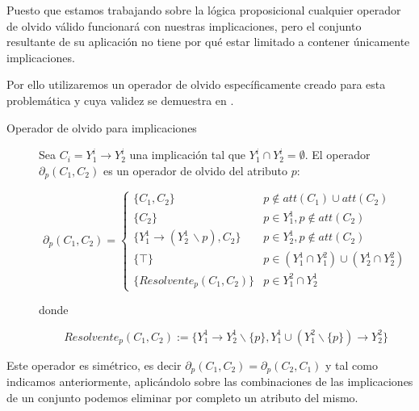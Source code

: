 	Puesto que estamos trabajando sobre la lógica proposicional cualquier operador de olvido válido funcionará con nuestras implicaciones, pero el conjunto resultante de su aplicación no tiene por qué estar limitado a contener únicamente implicaciones. 
	
	Por ello utilizaremos un operador de olvido específicamente creado para esta problemática y cuya validez se demuestra en .
	
	\begin{description}
		\item[Operador de olvido para implicaciones] 
			Sea $C_i = Y_{1}^i \rightarrow Y_{2}^i$  una implicación tal que $Y_{1}^i \cap Y_{2}^i = \emptyset$. El operador $\partial_p (C_1, C_2)$ es un operador de olvido del atributo $p$:
			
			\begin{equation}
				\label{operadorOlvido}
				\partial_p (C_1, C_2) = 			
					\begin{cases} 
						\{C_1, C_2\} & p \notin att(C_1) \cup att(C_2) \\
						\{C_2\} &  p \in Y_1^1, p \notin att(C_2) \\
						\{Y_1^1 \rightarrow (Y_2^1 \, \backslash p) , C_2\} & p \in Y_2^1, p \notin att(C_2) \\
						\{ \top \} & p \in (Y_1^1 \cap Y_1^2) \cup (Y_2^1 \cap Y_2^2) \\
						\{Resolvente_p(C_1, C_2)\} & p \in Y_1^2 \cap Y_2^1
					\end{cases}
			\end{equation}
			
			donde 
			
			\[
				Resolvente_p(C_1, C_2) := \{Y_1^1 \rightarrow Y_2^1 \backslash \{p\}, Y_1^1 \cup (Y_1^2 \backslash \{p\}) \rightarrow Y_2^2 \}
			\]
			
	\end{description}

	Este operador es simétrico, es decir $\partial_p (C_1, C_2) = \partial_p (C_2, C_1)$ y tal como indicamos anteriormente, aplicándolo sobre las combinaciones de las implicaciones de un conjunto podemos eliminar por completo un atributo del mismo.
	


